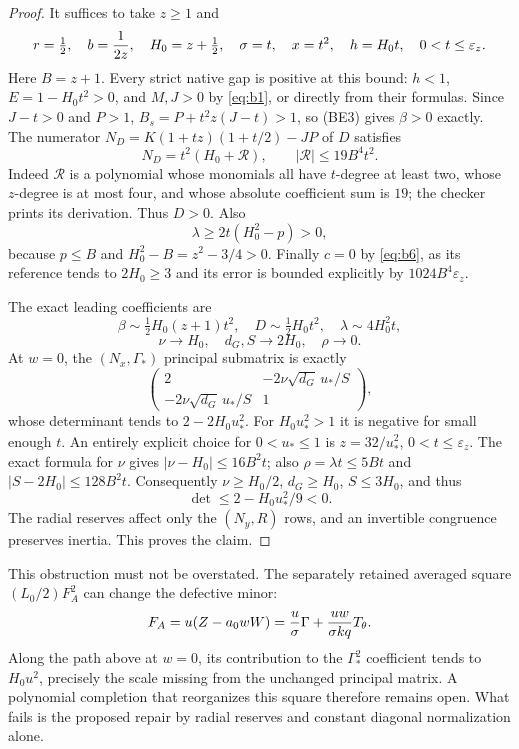 \documentclass[10pt]{article}
\newcommand{\eps}{\varepsilon}
\begin{document}
\begin{proof}
It suffices to take $z\ge1$ and
\[
 r=\tfrac12,\quad b={1\over2z},\quad H_0=z+\tfrac12,
 \quad\sigma=t,\quad x=t^2,\quad h=H_0t,
                     \quad0<t\le\eps_z.
\]
Here $B=z+1$. Every strict native gap is positive at this bound:
$h<1$, $E=1-H_0t^2>0$, and $M,J>0$ by \eqref{eq:b1}, or directly
from their formulas. Since $J-t>0$ and $P>1$,
$B_s=P+t^2z(J-t)>1$, so (BE3) gives $\beta>0$ exactly.
The numerator $N_D=K(1+tz)(1+t/2)-JP$ of $D$ satisfies
\[
 N_D=t^2(H_0+\mathcal R),\qquad |\mathcal R|\le19B^4t^2.
\]
Indeed $\mathcal R$ is a polynomial whose monomials all have
$t$-degree at least two, whose $z$-degree is at most four, and whose
absolute coefficient sum is $19$; the checker prints its derivation.
Thus $D>0$. Also
\[
 \lambda\ge2t(H_0^2-p)>0,
\]
because $p\le B$ and $H_0^2-B=z^2-3/4>0$. Finally $c=0$ by
\eqref{eq:b6}, as its reference tends to $2H_0\ge3$ and its error
is bounded explicitly by $1024B^4\eps_z$.

The exact leading coefficients are
\[
 \beta\sim\tfrac12H_0(z+1)t^2,\quad
 D\sim\tfrac12H_0t^2,\quad\lambda\sim4H_0^2t,
\]
\[
 \nu\longrightarrow H_0,\quad d_G,S\longrightarrow2H_0,
                         \quad\rho\longrightarrow0.
\]
At $w=0$, the $(N_x,\Gamma_*)$ principal submatrix is exactly
\[
 \begin{pmatrix}
 2&-2\nu\sqrt{d_G}\,u_*/S\\
 -2\nu\sqrt{d_G}\,u_*/S&1
 \end{pmatrix},
\]
whose determinant tends to $2-2H_0u_*^2$.
For $H_0u_*^2>1$ it is negative for small enough $t$.
An entirely explicit choice for $0<u_*\le1$ is
$z=32/u_*^2$, $0<t\le\eps_z$. The exact formula for $\nu$ gives
$|\nu-H_0|\le16B^2t$; also $\rho=\lambda t\le5Bt$ and
$|S-2H_0|\le128B^2t$. Consequently
$\nu\ge H_0/2$, $d_G\ge H_0$, $S\le3H_0$, and thus
\[
 \det\le2-H_0u_*^2/9<0.
\]
The radial reserves affect only the $(N_y,R)$ rows, and an
invertible congruence preserves inertia. This proves the claim.
\end{proof}

This obstruction must not be overstated. The separately retained
averaged square $(L_0/2)F_A^2$ can change the defective minor:
\[
 F_A=u(Z-a_0wW)={u\over\sigma}\Gamma
                         +{uw\over\sigma kq}T_\theta.
\]
Along the path above at $w=0$, its contribution to the
$\Gamma_*^2$ coefficient tends to $H_0u^2$, precisely the scale
missing from the unchanged principal matrix. A polynomial completion
that reorganizes this square therefore remains open. What fails is
the proposed repair by radial reserves and constant diagonal
normalization alone.
\end{document}
